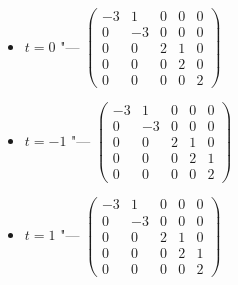 \begin{itemize}
    \item $t = 0$ "--- $\begin{pmatrix}
        -3 & 1 & 0 & 0 & 0\\
        0 & -3 & 0 & 0 & 0\\
        0 & 0 & 2 & 1 & 0 \\
        0 & 0 & 0 & 2 & 0\\
        0 & 0 & 0 & 0 & 2
    \end{pmatrix}$
    
    \item $t = -1$ "--- $\begin{pmatrix}
        -3 & 1 & 0 & 0 & 0\\
        0 & -3 & 0 & 0 & 0\\
        0 & 0 & 2 & 1 & 0 \\
        0 & 0 & 0 & 2 & 1\\
        0 & 0 & 0 & 0 & 2
    \end{pmatrix}$
    
    \item $t = 1$ "--- $\begin{pmatrix}
        -3 & 1 & 0 & 0 & 0\\
        0 & -3 & 0 & 0 & 0\\
        0 & 0 & 2 & 1 & 0 \\
        0 & 0 & 0 & 2 & 1\\
        0 & 0 & 0 & 0 & 2
    \end{pmatrix}$
    

\end{itemize}

